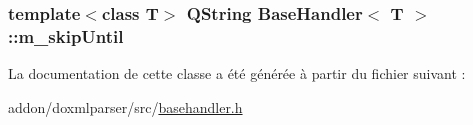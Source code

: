 \subsubsection[{m\+\_\+skip\+Until}]{\setlength{\rightskip}{0pt plus 5cm}template$<$class T$>$ {\bf Q\+String} {\bf Base\+Handler}$<$ T $>$\+::m\+\_\+skip\+Until\hspace{0.3cm}{\ttfamily [protected]}}\label{class_base_handler_a8e2ef23c5a489fe981e33eba88538635}


La documentation de cette classe a été générée à partir du fichier suivant \+:\begin{DoxyCompactItemize}
\item 
addon/doxmlparser/src/\hyperlink{basehandler_8h}{basehandler.\+h}\end{DoxyCompactItemize}
